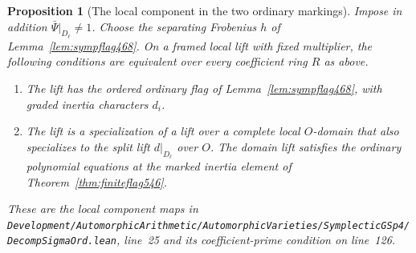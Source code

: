 \documentclass[a4paper,11pt]{article}
\newtheorem{proposition}{Proposition}[section]
\theoremstyle{definition}
\theoremstyle{remark}
\newcommand{\srcloc}[2]{{\small\nolinkurl{#1.lean}}, line~#2}
\numberwithin{equation}{section}
\begin{document}
\begin{proposition}[The local component in the two ordinary markings]
\leavevmode\label{prop:actualcomponent557}
Impose in addition \(\bar\Psi|_{D_\ell}\ne1\). Choose the
separating Frobenius \(h\) of Lemma~\ref{lem:sympflag468}.
On a framed local lift with fixed multiplier, the following
conditions are equivalent over every coefficient ring \(R\)
as above.
\begin{enumerate}
\item The lift has the ordered ordinary flag of
Lemma~\ref{lem:sympflag468}, with graded inertia characters \(d_i\).
\item The lift is a specialization of a lift over a complete
local \(O\)-domain that also specializes to the split lift
\(d|_{D_\ell}\) over \(O\). The domain lift satisfies the
ordinary polynomial equations at the marked inertia element
of Theorem~\ref{thm:finiteflag546}.
\end{enumerate}
These are the local component maps in
\srcloc{Development/AutomorphicArithmetic/AutomorphicVarieties/SymplecticGSp4/DecompSigmaOrd}{25}
and its coefficient-prime condition on line~126.
\end{proposition}
\end{document}
